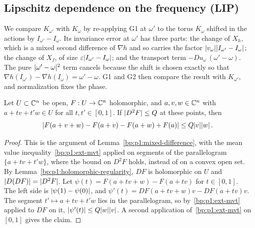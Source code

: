 \subsection{Lipschitz dependence on the frequency (LIP)}\label{bp:p4:sec-lip}

We compare $K_{\omega'}$ with $K_\omega$ by re-applying G1 at $\omega'$ to the torus $K_\omega$
shifted in the actions by $I_{\omega'}-I_\omega$. Its invariance error at $\omega'$ has three
parts: the change of $X_h$, which is a mixed second difference of $\nabla h$ and so carries the
factor $\lvert v_\omega\rvert\lvert I_{\omega'}-I_\omega\rvert$; the change of $X_f$, of size
$\varepsilon\lvert I_{\omega'}-I_\omega\rvert$; and the transport term $-Du_\omega\,(\omega'-\omega)$. The
pure $\lvert \omega'-\omega\rvert^2$ term cancels because the shift is chosen exactly so that
$\nabla h(I_{\omega'})-\nabla h(I_\omega)=\omega'-\omega$. G1 and G2 then compare the result with
$K_{\omega'}$, and normalization fixes the phase.

\begin{corollary}\label{bp:p4:mixed-difference}
Let $U\subset\mathbb{C}^n$ be open, $F:U\to\mathbb{C}^n$ holomorphic, and $a,v,w\in\mathbb{C}^n$ with
$a+tv+t'w\in U$ for all $t,t'\in[0,1]$. If $\lvert D^2F\rvert\le Q$ at these points, then
\begin{equation*}
\lvert F(a+v+w)-F(a+v)-F(a+w)+F(a)\rvert\le Q\lvert v\rvert\lvert w\rvert\,.
\end{equation*}
\end{corollary}

\begin{proof}
\label{step:p4:mixed-proof}
This is the argument of Lemma~\ref{bp:p1:mixed-difference}, with the mean value
inequality~\ref{bp:p1:ext-mvt} applied on segments of the parallelogram $\{a+tv+t'w\}$, where the bound
on $D^2F$ holds, instead of on a convex open set. By Lemma~\ref{bp:p1:holomorphic-regularity}, $DF$ is
holomorphic on $U$ and $\lvert D(DF)\rvert=\lvert D^2F\rvert$. Let $\psi(t)=F(a+tv+w)-F(a+tv)$ for $t\in[0,1]$. The
left side is $\lvert \psi(1)-\psi(0)\rvert$, and $\psi'(t)=DF(a+tv+w)v-DF(a+tv)v$. The segment
$t'\mapsto a+tv+t'w$ lies in the parallelogram, so by~\ref{bp:p1:ext-mvt} applied to $DF$ on it,
$\lvert \psi'(t)\rvert\le Q\lvert w\rvert\lvert v\rvert$. A second application of~\ref{bp:p1:ext-mvt} on $[0,1]$ gives the
claim.
\end{proof}


